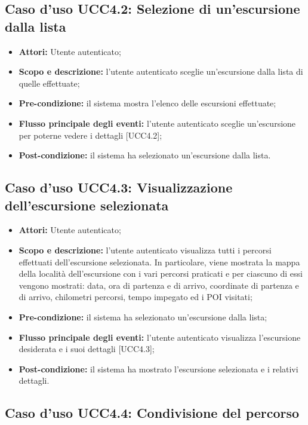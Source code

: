 \subsection{Caso d'uso UCC4.2: Selezione di un'escursione dalla lista}

\begin{itemize}
\item \textbf{Attori:} Utente autenticato;
\item \textbf{Scopo e descrizione:} l'utente autenticato sceglie un'escursione dalla lista di quelle effettuate;
\item \textbf{Pre-condizione:} il sistema mostra l'elenco delle escursioni effettuate;
\item \textbf{Flusso principale degli eventi:} l'utente autenticato sceglie un'escursione per poterne vedere i dettagli [UCC4.2];
\item \textbf{Post-condizione:} il sistema ha selezionato un'escursione dalla lista.
\end{itemize}

\subsection{Caso d'uso UCC4.3: Visualizzazione dell'escursione selezionata}

\begin{itemize}
\item \textbf{Attori:} Utente autenticato;
\item \textbf{Scopo e descrizione:} l'utente autenticato visualizza tutti i percorsi effettuati dell'escursione selezionata. In particolare, viene mostrata la mappa della località dell'escursione con i vari percorsi praticati e per ciascuno di essi vengono mostrati: data, ora di partenza e di arrivo, coordinate di partenza e di arrivo, chilometri percorsi, tempo impegato ed i POI visitati;
\item \textbf{Pre-condizione:} il sistema ha selezionato un'escursione dalla lista;
\item \textbf{Flusso principale degli eventi:} l'utente autenticato visualizza l'escursione desiderata e i suoi dettagli [UCC4.3];
\item \textbf{Post-condizione:} il sistema ha mostrato l'escursione selezionata e i relativi dettagli.
\end{itemize}

\subsection{Caso d'uso UCC4.4: Condivisione del percorso}

